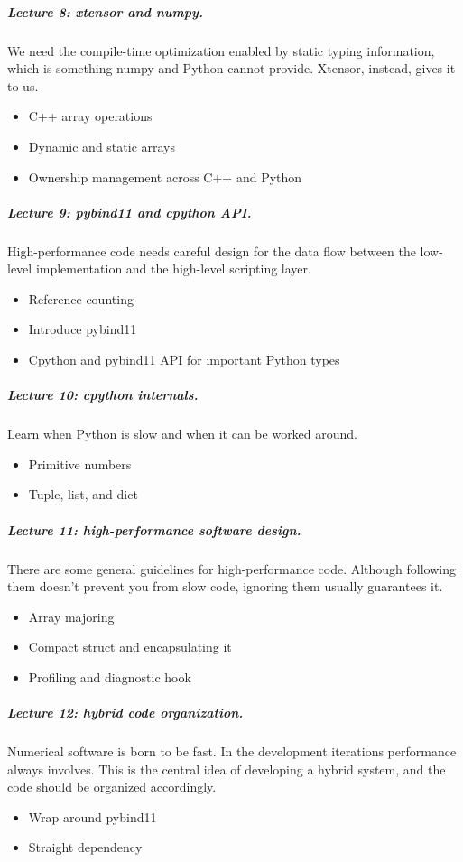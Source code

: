 \documentclass[11pt,a4paper]{article}
\begin{document}
\subparagraph{Lecture 8: xtensor and numpy.}  We need the compile-time
optimization enabled by static typing information, which is something numpy and
Python cannot provide.  Xtensor, instead, gives it to us.

\begin{itemize}
\item C++ array operations
\item Dynamic and static arrays
\item Ownership management across C++ and Python
\end{itemize}

\subparagraph{Lecture 9: pybind11 and cpython API.}  High-performance code
needs careful design for the data flow between the low-level implementation and
the high-level scripting layer.

\begin{itemize}
\item Reference counting
\item Introduce pybind11
\item Cpython and pybind11 API for important Python types
\end{itemize}

\subparagraph{Lecture 10: cpython internals.}  Learn when Python is slow and
when it can be worked around.

\begin{itemize}
\item Primitive numbers
\item Tuple, list, and dict
\end{itemize}

\subparagraph{Lecture 11: high-performance software design.}  There are some
general guidelines for high-performance code.  Although following them doesn't
prevent you from slow code, ignoring them usually guarantees it.

\begin{itemize}
\item Array majoring
\item Compact struct and encapsulating it
\item Profiling and diagnostic hook
\end{itemize}

\subparagraph{Lecture 12: hybrid code organization.}  Numerical software is
born to be fast.  In the development iterations performance always involves.
This is the central idea of developing a hybrid system, and the code should be
organized accordingly.

\begin{itemize}
\item Wrap around pybind11
\item Straight dependency
\end{itemize}
\end{document}
